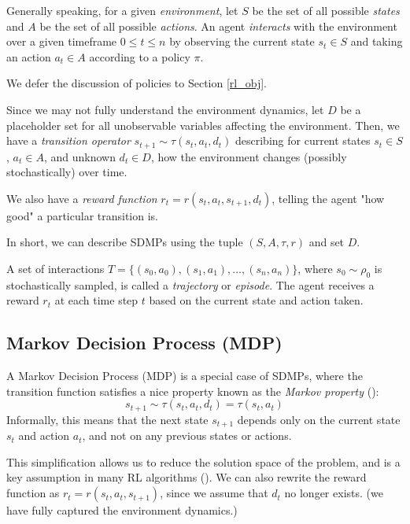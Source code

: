 \documentclass{article} %
\begin{document}
Generally speaking, for a given \textit{environment}, let $S$ be the set of all possible \textit{states}
and $A$ be the set of all possible \textit{actions}. An agent \textit{interacts} with the environment over a given timeframe 
$0 \leq t \leq n$ by observing the current state $s_t \in S$ and taking an action $a_t \in A$ according to a policy $\pi$.

We defer the discussion of policies to Section \ref{rl_obj}.

Since we may not fully understand the environment dynamics, 
let $D$ be a placeholder set for all unobservable variables affecting the environment.
Then, we have a \textit{transition operator} $s_{t+1} \sim \tau(s_t, a_t, d_t)$ 
describing for current states $s_t \in S$, $a_t \in A$, and unknown $d_t \in D$,
how the environment changes (possibly stochastically) over time.

We also have a \textit{reward function} $r_t = r(s_t, a_t, s_{t + 1}, d_t)$, 
telling the agent "how good" a particular transition is.

In short, we can describe SDMPs using the tuple $(S, A, \tau, r)$ and set $D$.

A set of interactions $T = \{(s_0, a_0), (s_1, a_1), \ldots, (s_n, a_n)\}$, where $s_0 \sim \rho_0$ is stochastically sampled, is called a \textit{trajectory} or \textit{episode}. 
The agent receives a reward $r_t$ at each time step $t$ based on the current state and action taken.

\subsection{Markov Decision Process (MDP)}
A Markov Decision Process (MDP) is a special case of SDMPs, where the transition function satisfies
a nice property known as the \textit{Markov property} (\cite{Sutton-and-Barto-1998}):
\begin{equation} \label{markov_property}
    s_{t+1} \sim \tau(s_t, a_t, d_t) = \tau(s_t, a_t)
\end{equation}
Informally, this means that the next state $s_{t+1}$ depends only on the current state $s_t$ and action $a_t$, and not on any previous states or actions.

This simplification allows us to reduce the solution space of the problem, and is a key assumption in many RL algorithms (\cite{Sutton-and-Barto-1998}).
We can also rewrite the reward function as $r_t = r(s_t, a_t, s_{t + 1})$, 
since we assume that $d_t$ no longer exists. (we have fully captured the environment dynamics.)
\end{document}
